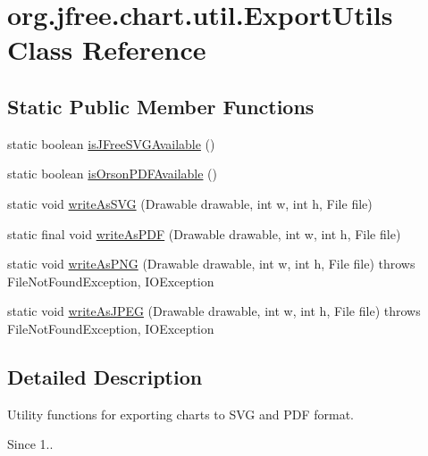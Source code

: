 \hypertarget{classorg_1_1jfree_1_1chart_1_1util_1_1_export_utils}{}\section{org.\+jfree.\+chart.\+util.\+Export\+Utils Class Reference}
\label{classorg_1_1jfree_1_1chart_1_1util_1_1_export_utils}
\subsection*{Static Public Member Functions}
\begin{DoxyCompactItemize}
\item 
static boolean \mbox{\hyperlink{classorg_1_1jfree_1_1chart_1_1util_1_1_export_utils_ac806389bfd7c8e54855366a0bd72bfcf}{is\+J\+Free\+S\+V\+G\+Available}} ()
\item 
static boolean \mbox{\hyperlink{classorg_1_1jfree_1_1chart_1_1util_1_1_export_utils_a0fe7576ac9714907ff5b61d77b6bdd58}{is\+Orson\+P\+D\+F\+Available}} ()
\item 
static void \mbox{\hyperlink{classorg_1_1jfree_1_1chart_1_1util_1_1_export_utils_a9c7aaec10ebbedc62d6272ac36531c4c}{write\+As\+S\+VG}} (Drawable drawable, int w, int h, File file)
\item 
static final void \mbox{\hyperlink{classorg_1_1jfree_1_1chart_1_1util_1_1_export_utils_a9aa8e8cc9149f3bf3fc3b8076f3f3c3a}{write\+As\+P\+DF}} (Drawable drawable, int w, int h, File file)
\item 
static void \mbox{\hyperlink{classorg_1_1jfree_1_1chart_1_1util_1_1_export_utils_a92f7f6a291e22be64a0cec3d18db813f}{write\+As\+P\+NG}} (Drawable drawable, int w, int h, File file)  throws File\+Not\+Found\+Exception, I\+O\+Exception 
\item 
static void \mbox{\hyperlink{classorg_1_1jfree_1_1chart_1_1util_1_1_export_utils_abdd6b3b76005c38f921f7ec02979509f}{write\+As\+J\+P\+EG}} (Drawable drawable, int w, int h, File file)  throws File\+Not\+Found\+Exception, I\+O\+Exception 
\end{DoxyCompactItemize}


\subsection{Detailed Description}
Utility functions for exporting charts to S\+VG and P\+DF format.

\begin{DoxySince}{Since}
1.. 
\end{DoxySince}


